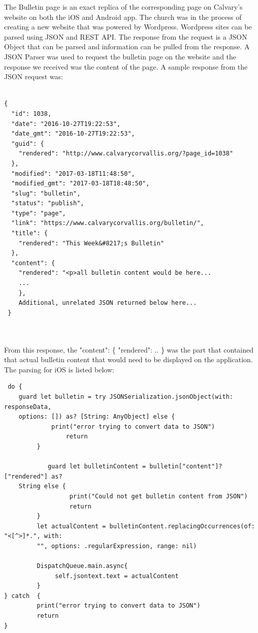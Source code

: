 \documentclass[letterpaper,10pt,draftclsnofoot,onecolumn,titlepage]{IEEEtran}
\begin{document}
		The Bulletin page is an exact replica of the corresponding page on Calvary's website on both the iOS and Android app.
		The church was in the process of creating a new website that was powered by Wordpress.
		Wordpress sites can be parsed using JSON and REST API.
		The response from the request is a JSON Object that can be parsed and information can be pulled from the response.
		A JSON Parser was used to request the bulletin page on the website and the response we received was the content of the page.
		A sample response from the JSON request was:

		\begin{lstlisting}

{
  "id": 1038,
  "date": "2016-10-27T19:22:53",
  "date_gmt": "2016-10-27T19:22:53",
  "guid": {
    "rendered": "http://www.calvarycorvallis.org/?page_id=1038"
  },
  "modified": "2017-03-18T11:48:50",
  "modified_gmt": "2017-03-18T18:48:50",
  "slug": "bulletin",
  "status": "publish",
  "type": "page",
  "link": "https://www.calvarycorvallis.org/bulletin/",
  "title": {
    "rendered": "This Week&#8217;s Bulletin"
  },
  "content": {
    "rendered": "<p>all bulletin content would be here...
    ...
    },
    Additional, unrelated JSON returned below here...
 }



		\end{lstlisting}

		From this response, the "content": \{ "rendered": .. \} was the part that contained that actual bulletin content that would need to be displayed on the application.
		The parsing for iOS is listed below:

		\begin{lstlisting}
 do {
 	guard let bulletin = try JSONSerialization.jsonObject(with: responseData,
	options: []) as? [String: AnyObject] else {
	         print("error trying to convert data to JSON")
                 return
         }

        	guard let bulletinContent = bulletin["content"]?["rendered"] as?
	String else {
                  print("Could not get bulletin content from JSON")
                  return
         }
         let actualContent = bulletinContent.replacingOccurrences(of: "<[^>]*.", with:
         "", options: .regularExpression, range: nil)

         DispatchQueue.main.async{
 	          self.jsontext.text = actualContent
         }
} catch  {
         print("error trying to convert data to JSON")
         return
}
\end{lstlisting}
\end{document}
